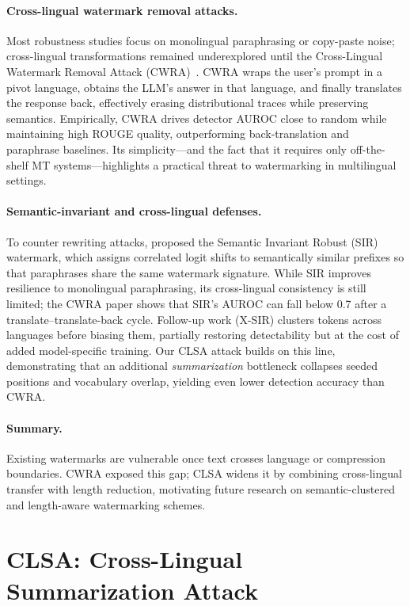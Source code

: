 \documentclass{article}
\begin{document}
\paragraph{Cross-lingual watermark removal attacks.}
Most robustness studies focus on monolingual paraphrasing or copy-paste noise; cross-lingual transformations remained underexplored until the Cross-Lingual Watermark Removal Attack (CWRA)~\citep{He2024cwra}.
CWRA wraps the user’s prompt in a pivot language, obtains the LLM’s answer in that language, and finally translates the response back, effectively erasing distributional traces while preserving semantics.  
Empirically, CWRA drives detector AUROC close to random while maintaining high ROUGE quality, outperforming back-translation and paraphrase baselines.
Its simplicity—and the fact that it requires only off-the-shelf MT systems—highlights a practical threat to watermarking in multilingual settings.

\paragraph{Semantic-invariant and cross-lingual defenses.}
To counter rewriting attacks, \citet{liu2024sir} proposed the Semantic Invariant Robust (SIR) watermark, which assigns correlated logit shifts to semantically similar prefixes so that paraphrases share the same watermark signature.
While SIR improves resilience to monolingual paraphrasing, its cross-lingual consistency is still limited; the CWRA paper shows that SIR’s AUROC can fall below 0.7 after a translate–translate-back cycle.
Follow-up work (X-SIR) clusters tokens across languages before biasing them, partially restoring detectability but at the cost of added model-specific training.
Our CLSA attack builds on this line, demonstrating that an additional \emph{summarization} bottleneck collapses seeded positions and vocabulary overlap, yielding even lower detection accuracy than CWRA.

\paragraph{Summary.}
Existing watermarks are vulnerable once text crosses language or compression boundaries.  CWRA exposed this gap; CLSA widens it by combining cross-lingual transfer with length reduction, motivating future research on semantic-clustered and length-aware watermarking schemes.

\section{CLSA: Cross-Lingual Summarization Attack}
\end{document}
